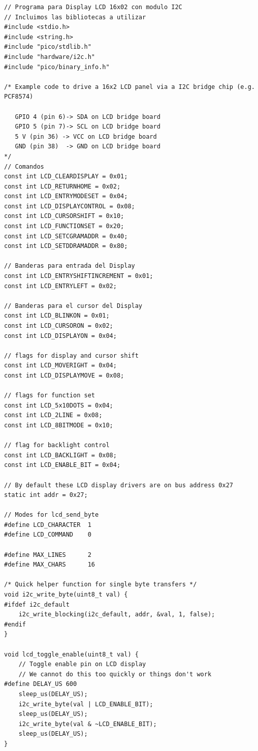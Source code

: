 \documentclass[12pt]{book} %
\begin{document}
\begin{lstlisting}
// Programa para Display LCD 16x02 con modulo I2C
// Incluimos las bibliotecas a utilizar
#include <stdio.h>
#include <string.h>
#include "pico/stdlib.h"
#include "hardware/i2c.h"
#include "pico/binary_info.h"

/* Example code to drive a 16x2 LCD panel via a I2C bridge chip (e.g. PCF8574)

   GPIO 4 (pin 6)-> SDA on LCD bridge board
   GPIO 5 (pin 7)-> SCL on LCD bridge board
   5 V (pin 36) -> VCC on LCD bridge board
   GND (pin 38)  -> GND on LCD bridge board
*/
// Comandos
const int LCD_CLEARDISPLAY = 0x01;
const int LCD_RETURNHOME = 0x02;
const int LCD_ENTRYMODESET = 0x04;
const int LCD_DISPLAYCONTROL = 0x08;
const int LCD_CURSORSHIFT = 0x10;
const int LCD_FUNCTIONSET = 0x20;
const int LCD_SETCGRAMADDR = 0x40;
const int LCD_SETDDRAMADDR = 0x80;

// Banderas para entrada del Display
const int LCD_ENTRYSHIFTINCREMENT = 0x01;
const int LCD_ENTRYLEFT = 0x02;

// Banderas para el cursor del Display
const int LCD_BLINKON = 0x01;
const int LCD_CURSORON = 0x02;
const int LCD_DISPLAYON = 0x04;

// flags for display and cursor shift
const int LCD_MOVERIGHT = 0x04;
const int LCD_DISPLAYMOVE = 0x08;

// flags for function set
const int LCD_5x10DOTS = 0x04;
const int LCD_2LINE = 0x08;
const int LCD_8BITMODE = 0x10;

// flag for backlight control
const int LCD_BACKLIGHT = 0x08;
const int LCD_ENABLE_BIT = 0x04;

// By default these LCD display drivers are on bus address 0x27
static int addr = 0x27;

// Modes for lcd_send_byte
#define LCD_CHARACTER  1
#define LCD_COMMAND    0

#define MAX_LINES      2
#define MAX_CHARS      16

/* Quick helper function for single byte transfers */
void i2c_write_byte(uint8_t val) {
#ifdef i2c_default
    i2c_write_blocking(i2c_default, addr, &val, 1, false);
#endif
}

void lcd_toggle_enable(uint8_t val) {
    // Toggle enable pin on LCD display
    // We cannot do this too quickly or things don't work
#define DELAY_US 600
    sleep_us(DELAY_US);
    i2c_write_byte(val | LCD_ENABLE_BIT);
    sleep_us(DELAY_US);
    i2c_write_byte(val & ~LCD_ENABLE_BIT);
    sleep_us(DELAY_US);
}


\end{lstlisting}
\end{document}
